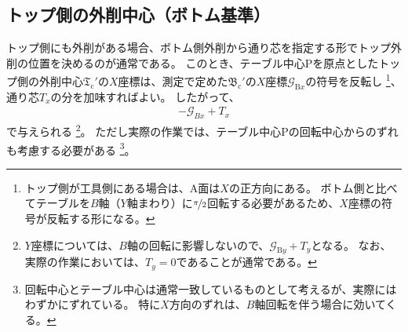 \subsection{トップ側の外削中心（ボトム基準）}
トップ側にも外削がある場合、ボトム側外削から通り芯を指定する形でトップ外削の位置を決めるのが通常である。
このとき、テーブル中心Pを原点としたトップ側の外削中心$\mathfrak T_\mathrm c'$の$X$座標は、測定で定めた$\mathfrak B_\mathrm c'$の$X$座標$\mathcal G_{\mathrm Bx}$の符号を反転し
\footnote{トップ側が工具側にある場合は、A面は$X$の正方向にある。
ボトム側と比べてテーブルを$B$軸（$Y$軸まわり）に$\nicefrac\pi2$回転する必要があるため、$X$座標の符号が反転する形になる。}、
通り芯$T_x$の分を加味すればよい。
したがって、
\begin{align}
  \label{eq:BbasedTx}
  -\mathcal G_{Bx}+T_x
\end{align}
で与えられる
\footnote{$Y$座標については、$B$軸の回転に影響しないので、$\mathcal G_{\mathrm By}+T_y$となる。
なお、実際の作業においては、$T_y = 0$であることが通常である。}。
ただし実際の作業では、テーブル中心Pの回転中心からのずれも考慮する必要がある
\footnote{回転中心とテーブル中心は通常一致しているものとして考えるが、実際にはわずかにずれている。
特に$X$方向のずれは、$B$軸回転を伴う場合に効いてくる。}。



\clearpage


